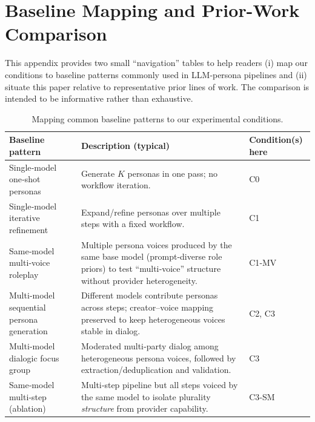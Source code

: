 \documentclass[acmsmall]{acmart}
\begin{document}
\section{Baseline Mapping and Prior-Work Comparison}
\label{sec:supp-baseline-mapping}
This appendix provides two small ``navigation'' tables to help readers (i) map our conditions to baseline patterns commonly used in LLM‑persona pipelines and (ii) situate this paper relative to representative prior lines of work. The comparison is intended to be informative rather than exhaustive.

\begin{table}[h!]
  \centering
  \caption{Mapping common baseline patterns to our experimental conditions.}
  \label{tab:baseline-mapping}
  \small
  \setlength{\tabcolsep}{5pt}
  \begin{tabularx}{\linewidth}{@{}p{3.25cm}X p{2.8cm}@{}}
    \toprule
    \textbf{Baseline pattern} & \textbf{Description (typical)} & \textbf{Condition(s) here} \\
    \midrule
    Single‑model one‑shot personas & Generate \(K\) personas in one pass; no workflow iteration. & C0 \\
    Single‑model iterative refinement & Expand/refine personas over multiple steps with a fixed workflow. & C1 \\
    Same‑model multi‑voice roleplay & Multiple persona voices produced by the same base model (prompt‑diverse role priors) to test ``multi‑voice'' structure without provider heterogeneity. & C1‑MV \\
    Multi‑model sequential persona generation & Different models contribute personas across steps; creator–voice mapping preserved to keep heterogeneous voices stable in dialog. & C2, C3 \\
    Multi‑model dialogic focus group & Moderated multi‑party dialog among heterogeneous persona voices, followed by extraction/deduplication and validation. & C3 \\
    Same‑model multi‑step (ablation) & Multi‑step pipeline but all steps voiced by the same model to isolate plurality \emph{structure} from provider capability. & C3‑SM \\
    \bottomrule
  \end{tabularx}
\end{table}
\end{document}
